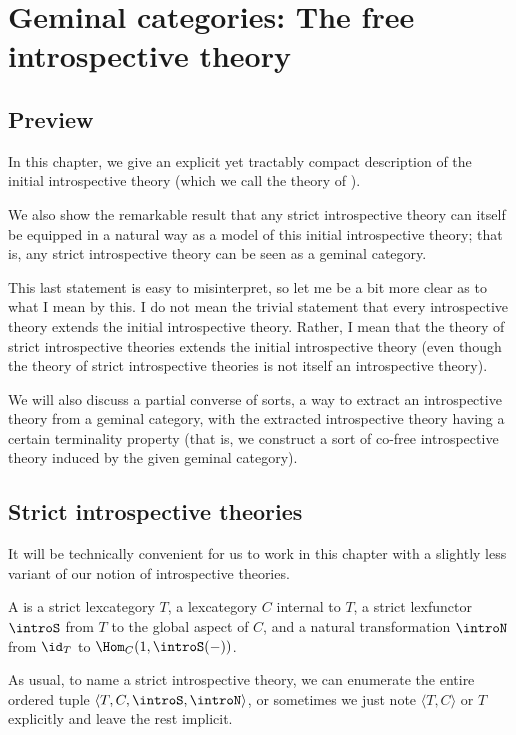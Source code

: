 \filestart

\section{Geminal categories: The free introspective theory}\label{GeminalChapter}
\subsection{Preview}
In this chapter, we give an explicit yet tractably compact description of the initial introspective theory (which we call the theory of ).

We also show the remarkable result that any strict introspective theory can itself be equipped in a natural way as a model of this initial introspective theory; that is, any strict introspective theory can be seen as a geminal category.

This last statement is easy to misinterpret, so let me be a bit more clear as to what I mean by this. I do not mean the trivial statement that every introspective theory extends the initial introspective theory. Rather, I mean that the theory of strict introspective theories extends the initial introspective theory (even though the theory of strict introspective theories is not itself an introspective theory).

We will also discuss a partial converse of sorts, a way to extract an introspective theory from a geminal category, with the extracted introspective theory having a certain terminality property (that is, we construct a sort of co-free introspective theory induced by the given geminal category).

\subsection{Strict introspective theories}
It will be technically convenient for us to work in this chapter with a slightly less  variant of our notion of introspective theories.

\begin{definition}
A  is a strict lexcategory $T$, a lexcategory $C$ internal to $T$, a strict lexfunctor $\introS$ from $T$ to the global aspect of $C$, and a natural transformation $\introN$ from $\id_T$ to $\Hom_C(1, \introS(-))$.
\end{definition}

As usual, to name a strict introspective theory, we can enumerate the entire ordered tuple $\langle T, C, \introS, \introN \rangle$, or sometimes we just note $\langle T, C \rangle$ or $T$ explicitly and leave the rest implicit.

